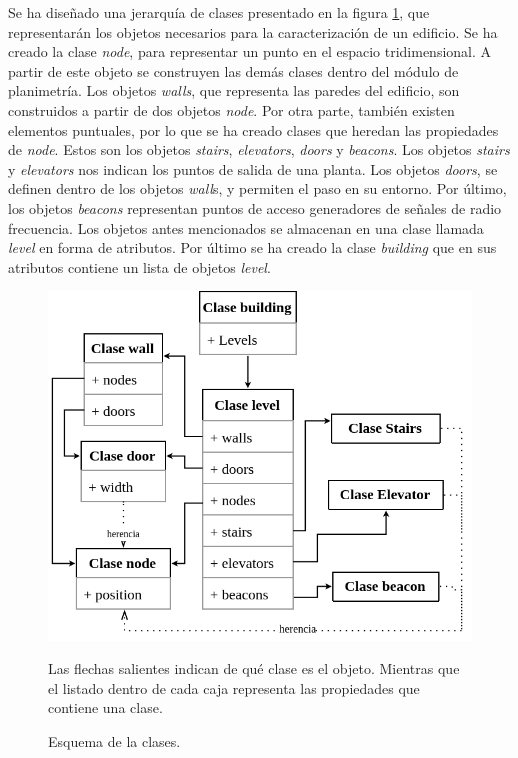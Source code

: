 Se ha diseñado una jerarquía de clases presentado en la figura \ref{fig:esquemabuilding}, que representarán los objetos necesarios para la caracterización de un edificio. Se ha creado la clase \emph{node}, para representar un punto en el espacio tridimensional. A partir de este objeto se construyen las demás clases dentro del módulo de planimetría. Los objetos \emph{walls}, que representa  las paredes del edificio, son construidos a partir de dos objetos \emph{node}. Por otra parte, también existen  elementos puntuales, por lo que se ha creado clases que heredan las propiedades de \emph{node}. Estos son los objetos \emph{stairs}, \emph{elevators}, \emph{doors} y \emph{beacons}. Los objetos \emph{stairs} y \emph{elevators} nos indican los puntos de salida de una planta. Los objetos \emph{doors}, se definen dentro de los objetos \emph{wall}s, y permiten el paso en su entorno. Por último, los objetos \emph{beacons} representan puntos de acceso generadores de señales de radio frecuencia. Los objetos antes mencionados se almacenan en una clase llamada \emph{level} en forma de atributos. Por último se ha creado la clase \emph{building} que en sus atributos contiene un lista de objetos \emph{level}. 
\begin{figure}[!ht]
    \centering
    \includegraphics[width=0.8     \columnwidth]{img/Design/planimetria.png} 
    \caption[]{Esquema de la clases.}
    \footnotesize
    Las flechas salientes indican de qué clase es el objeto. Mientras que el listado dentro de cada caja representa las propiedades que contiene una clase. 
    \label{fig:esquemabuilding}
\end{figure}   


